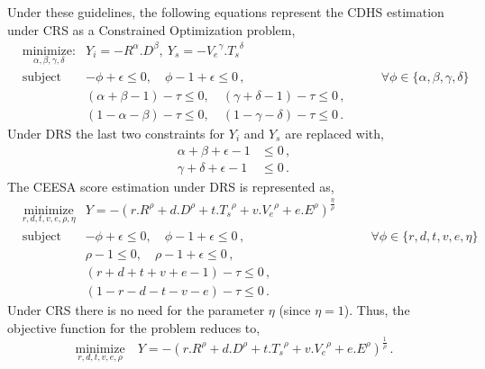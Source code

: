 \documentclass[10pt,draft]{article}
\begin{document}
Under these guidelines, the following equations represent the CDHS estimation under CRS as a Constrained Optimization problem,
\begin{equation}\label{eq:cdhscrs}
  \begin{aligned}
    & \underset{\alpha,\beta,\gamma,\delta}{\text{minimize:}}
    & Y_i = {-}R^\alpha.D^\beta,\ Y_s = {-}{V_e}^\gamma.{T_s}^\delta\\
    & \text{subject to:}
    &  {-}\phi + \epsilon \leq 0,\quad\phi - 1 + \epsilon \leq 0\,, &\quad\quad \forall \phi\in\{\alpha,\beta,\gamma,\delta\}\\
    && (\alpha+\beta-1) - \tau \leq 0,\quad(\gamma+\delta-1) - \tau \leq 0\,,\\
    && (1-\alpha-\beta) - \tau \leq 0,\quad(1-\gamma-\delta) - \tau \leq 0\,.
  \end{aligned}
\end{equation}
Under DRS the last two constraints for $Y_i$ and $Y_s$ are replaced with,
\begin{equation}\label{eq:cdhsdrs}
  \begin{aligned}
    \alpha + \beta + \epsilon - 1 &\leq 0\,,\\
    \gamma + \delta + \epsilon - 1 &\leq 0\,.
  \end{aligned}
\end{equation}
The CEESA score estimation under DRS is represented as,
\begin{equation}\label{eq:ceesadrs}
  \begin{aligned}
    & \underset{r,d,t,v,e,\rho,\eta}{\text{minimize}}
    & Y = {-}{(r.R^\rho+d.D^\rho+t.{T_s}^\rho+v.{V_e}^\rho+e.E^\rho)}^{\frac{\eta}{\rho}}\\
    & \text{subject to}
    &   {-}\phi + \epsilon \leq 0,\quad\phi - 1 + \epsilon \leq 0\,, &\quad\quad \forall \phi\in\{r,d,t,v,e,\eta\}\\
    && \rho - 1 \leq 0,\quad \rho - 1 + \epsilon \leq 0\,,\\
    && (r+d+t+v+e-1) - \tau \leq 0\,,\\
    && (1-r-d-t-v-e) - \tau \leq 0\,.
  \end{aligned}
\end{equation}
Under CRS there is no need for the parameter $\eta$ (since $\eta=1$). Thus, the objective function for the problem reduces to,
\begin{equation}\label{eq:ceesacrs}
  \underset{r,d,t,v,e,\rho}{\text{minimize}}\quad
  Y = {-}{(r.R^\rho+d.D^\rho+t.{T_s}^\rho+v.{V_e}^\rho+e.E^\rho)}^{\frac{1}{\rho}}\,.
\end{equation}
\end{document}
